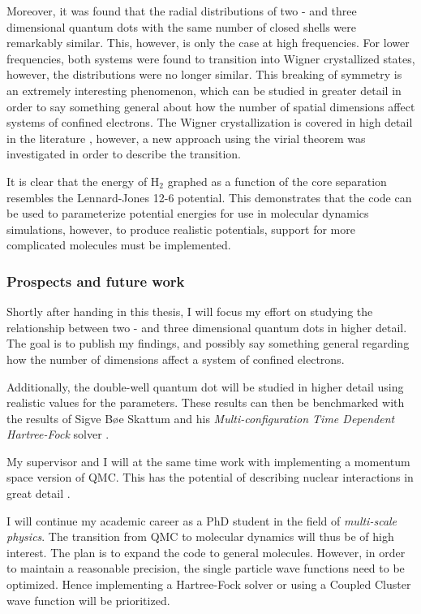 Moreover, it was found that the radial distributions of two - and three dimensional quantum dots with the same number of closed shells were remarkably similar. This, however, is only the case at high frequencies. For lower frequencies, both systems were found to transition into Wigner crystallized states, however, the distributions were no longer similar. This breaking of symmetry is an extremely interesting phenomenon, which can be studied in greater detail in order to say something general about how the number of spatial dimensions affect systems of confined electrons. The Wigner crystallization is covered in high detail in the literature \cite{WignerTransport, WignerPathTo, WignerSymmetryBreak, WignerFloating, Wigner2DQD}, however, a new approach using the virial theorem was investigated in order to describe the transition.  

It is clear that the energy of $\mathrm{H_2}$ graphed as a function of the core separation resembles the Lennard-Jones 12-6 potential. This demonstrates that the code can be used to parameterize potential energies for use in molecular dynamics simulations, however, to produce realistic potentials, support for more complicated molecules must be implemented. 

\subsubsection{Prospects and future work}

Shortly after handing in this thesis, I will focus my effort on studying the relationship between two - and three dimensional quantum dots in higher detail. The goal is to publish my findings, and possibly say something general regarding how the number of dimensions affect a system of confined electrons.

Additionally, the double-well quantum dot will be studied in higher detail using realistic values for the parameters. These results can then be benchmarked with the results of Sigve Bøe Skattum and his \textit{Multi-configuration Time Dependent Hartree-Fock} solver \cite{Sigve}.

My supervisor and I will at the same time work with implementing a momentum space version of QMC. This has the potential of describing nuclear interactions in great detail \cite{momentspaceQMC}. 

I will continue my academic career as a PhD student in the field of \textit{multi-scale physics}. The transition from QMC to molecular dynamics will thus be of high interest. The plan is to expand the code to general molecules. However, in order to maintain a reasonable precision, the single particle wave functions need to be optimized. Hence implementing a Hartree-Fock solver \cite{Shavitt} or using a Coupled Cluster wave function \cite{CCSD_WF} will be prioritized.


